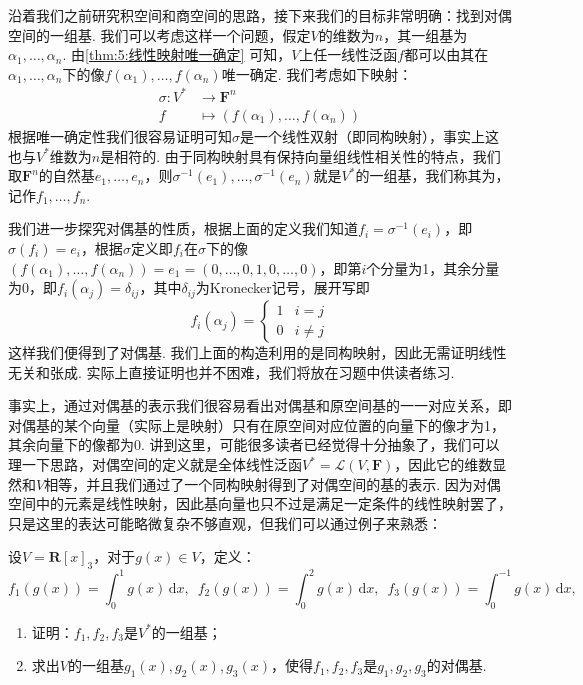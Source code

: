 沿着我们之前研究积空间和商空间的思路，接下来我们的目标非常明确：找到对偶空间的一组基. 我们可以考虑这样一个问题，假定$V$的维数为$n$，其一组基为$\alpha_1,\ldots,\alpha_n$. 由\autoref{thm:5:线性映射唯一确定} 可知，$V$上任一线性泛函$f$都可以由其在$\alpha_1,\ldots,\alpha_n$下的像$f(\alpha_1),\ldots,f(\alpha_n)$唯一确定. 我们考虑如下映射：
\begin{align*}
    \sigma:V^* & \to\mathbf{F}^n                         \\
    f          & \mapsto(f(\alpha_1),\ldots,f(\alpha_n))
\end{align*}
根据唯一确定性我们很容易证明可知$\sigma$是一个线性双射（即同构映射），事实上这也与$V^*$维数为$n$是相符的. 由于同构映射具有保持向量组线性相关性的特点，我们取$\mathbf{F}^n$的自然基$e_1,\ldots,e_n$，则$\sigma^{-1}(e_1),\ldots,\sigma^{-1}(e_n)$就是$V^*$的一组基，我们称其为，记作$f_1,\ldots,f_n$.

我们进一步探究对偶基的性质，根据上面的定义我们知道$f_i=\sigma^{-1}(e_i)$，即$\sigma(f_i)=e_i$，根据$\sigma$定义即$f_i$在$\sigma$下的像$(f(\alpha_1),\ldots,f(\alpha_n))=e_1=(0,\ldots,0,1,0,\ldots,0)$，即第$i$个分量为1，其余分量为0，即$f_i(\alpha_j)=\delta_{ij}$，其中$\delta_{ij}$为Kronecker记号，展开写即
\[f_i(\alpha_j)=\begin{cases}
        1 & i=j     \\
        0 & i\neq j
    \end{cases}\]
这样我们便得到了对偶基. 我们上面的构造利用的是同构映射，因此无需证明线性无关和张成. 实际上直接证明也并不困难，我们将放在习题中供读者练习.

事实上，通过对偶基的表示我们很容易看出对偶基和原空间基的一一对应关系，即对偶基的某个向量（实际上是映射）只有在原空间对应位置的向量下的像才为1，其余向量下的像都为0. 讲到这里，可能很多读者已经觉得十分抽象了，我们可以理一下思路，对偶空间的定义就是全体线性泛函$V^*=\mathcal{L}(V,\mathbf{F})$，因此它的维数显然和$V$相等，并且我们通过了一个同构映射得到了对偶空间的基的表示. 因为对偶空间中的元素是线性映射，因此基向量也只不过是满足一定条件的线性映射罢了，只是这里的表达可能略微复杂不够直观，但我们可以通过例子来熟悉：
\begin{example}
    设$V=\mathbf{R}[x]_3$，对于$g(x)\in V$，定义：
    \[f_1(g(x))=\displaystyle\int_0^1g(x)\,\mathrm{d}x,\enspace f_2(g(x))=\int_0^2g(x)\,\mathrm{d}x,\enspace f_3(g(x))=\int_0^{-1}g(x)\,\mathrm{d}x,\]
    \begin{enumerate}
        \item 证明：$f_1,f_2,f_3$是$V^*$的一组基；

        \item 求出$V$的一组基$g_1(x),g_2(x),g_3(x)$，使得$f_1,f_2,f_3$是$g_1,g_2,g_3$的对偶基.
    \end{enumerate}
\end{example}

